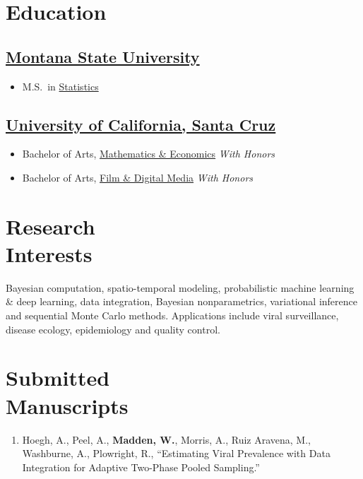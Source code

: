 \documentclass{wm_cv}
\begin{document}
\maketitle%

\section{Education}

\subsection{\href{https://www.montana.edu/}{Montana State University}} 
\vspace{-\parskip}%
\begin{itemize}[label={}]
  \item M.S.\ in \href{http://catalog.montana.edu/graduate/letters-science/mathematical-sciences/ms-statistics/}{Statistics} 
\end{itemize}

\subsection{\href{https://www.ucsc.edu/}{University of California, Santa Cruz}}
\vspace{-\parskip}%
\begin{itemize}[label={}]
  \item Bachelor of Arts, \href{https://economics.ucsc.edu/academics/undergraduate-program/majors-minor/econ-math.html}{Mathematics \& Economics} \emph{With Honors}
  \item Bachelor of Arts, \href{https://admissions.sa.ucsc.edu/majors/filmdigital}{Film \& Digital Media} \emph{With Honors}
\end{itemize}

\section{Research \\ Interests}

Bayesian computation, spatio-temporal modeling, probabilistic machine learning \& deep learning, data integration, Bayesian nonparametrics, variational inference and sequential Monte Carlo methods. Applications include viral surveillance, disease ecology, epidemiology and quality control. 

\section{Submitted \\ Manuscripts}
\begin{enumerate}
  \item Hoegh, A., Peel, A., \textbf{Madden, W.}, Morris, A., Ruiz Aravena, M., Washburne, A., Plowright, R., ``Estimating Viral Prevalence with Data Integration for Adaptive Two-Phase Pooled Sampling.''
\end{enumerate}
\end{document}
